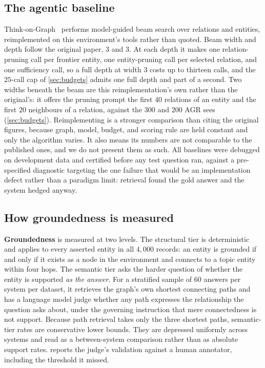 \subsection{The agentic baseline}\label{app:tog}

Think-on-Graph~\cite{sun2024think} performs model-guided beam search
over relations and entities, reimplemented on this environment's tools
rather than quoted. Beam width and depth follow the original paper, $3$
and $3$. At each depth it makes one relation-pruning call per frontier
entity, one entity-pruning call per selected relation, and one
sufficiency call, so a full depth at width $3$ costs up to thirteen
calls, and the $25$-call cap of \ref{sec:budgets} admits one full depth
and part of a second. Two widths beneath the beam are this
reimplementation's own rather than the original's: it offers the pruning
prompt the first $40$ relations of an entity and the first $20$
neighbours of a relation, against the $300$ and $200$ AGR sees
(\ref{sec:budgets}). Reimplementing is a stronger comparison than citing
the original figures, because graph, model, budget, and scoring rule are
held constant and only the algorithm varies. It also means its numbers
are not comparable to the published ones, and we do not present them as
such. All baselines were debugged on development data and certified
before any test question ran, against a pre-specified diagnostic
targeting the one failure that would be an implementation defect rather
than a paradigm limit: retrieval found the gold answer and the system
hedged anyway.

\subsection{How groundedness is measured}\label{app:groundedness}

\textbf{Groundedness} is measured at two levels. The structural tier is
deterministic and applies to every asserted entity in all $4{,}000$
records: an entity is grounded if and only if it exists as a node in the
environment and connects to a topic entity within four hops. The
semantic tier asks the harder question of whether the entity is
supported \emph{as the answer}. For a stratified sample of $60$ answers
per system per dataset, it retrieves the graph's own shortest connecting
paths and has a language model judge whether any path expresses the
relationship the question asks about, under the governing instruction
that mere connectedness is not support. Because path retrieval takes
only the three shortest paths, semantic-tier rates are conservative
lower bounds. They are depressed uniformly across systems and read as a
between-system comparison rather than as absolute support rates.
 reports the judge's validation against a human
annotator, including the threshold it missed.
